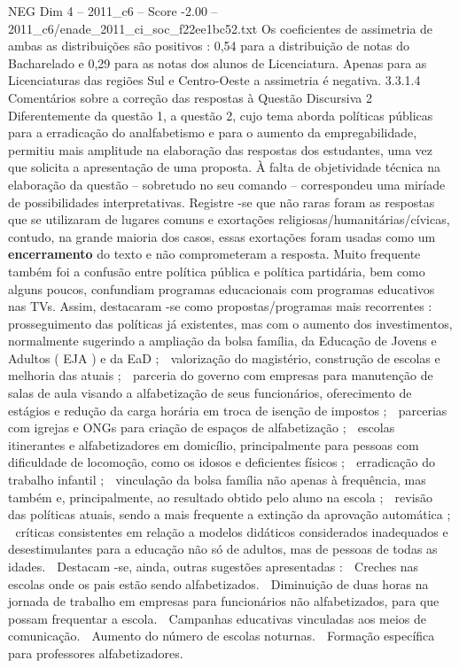 \begin{textsample}{NEG Dim 4 – 2011\_c6 – Score -2.00 – 2011\_c6/enade\_2011\_ci\_soc\_f22ee1bc52.txt}
Os coeficientes de assimetria de ambas as distribuições são positivos : 0,54 para a distribuição de notas do Bacharelado e 0,29 para as notas dos alunos de Licenciatura.
Apenas para as Licenciaturas das regiões Sul e Centro-Oeste a assimetria é negativa. 3.3.1.4 Comentários sobre a correção das respostas à Questão Discursiva 2 Diferentemente da questão 1, a questão 2, cujo tema aborda políticas públicas para a erradicação do analfabetismo e para o aumento da empregabilidade, permitiu mais amplitude na elaboração das respostas dos estudantes, uma vez que solicita a apresentação de uma proposta.
À falta de objetividade técnica na elaboração da questão – sobretudo no seu comando – correspondeu uma miríade de possibilidades interpretativas.
Registre -se que não raras foram as respostas que se utilizaram de lugares comuns e exortações religiosas/humanitárias/cívicas, contudo, na grande maioria dos casos, essas exortações foram usadas como um \textbf{encerramento} do texto e não comprometeram a resposta.
Muito frequente também foi a confusão entre política pública e política partidária, bem como alguns poucos, confundiam programas educacionais com programas educativos nas TVs.
Assim, destacaram -se como propostas/programas mais recorrentes :  prosseguimento das políticas já existentes, mas com o aumento dos investimentos, normalmente sugerindo a ampliação da bolsa família, da Educação de Jovens e Adultos ( EJA ) e da EaD ;  valorização do magistério, construção de escolas e melhoria das atuais ;  parceria do governo com empresas para manutenção de salas de aula visando a alfabetização de seus funcionários, oferecimento de estágios e redução da carga horária em troca de isenção de impostos ;  parcerias com igrejas e ONGs para criação de espaços de alfabetização ;  escolas itinerantes e alfabetizadores em domicílio, principalmente para pessoas com dificuldade de locomoção, como os idosos e deficientes físicos ;  erradicação do trabalho infantil ;  vinculação da bolsa família não apenas à frequência, mas também e, principalmente, ao resultado obtido pelo aluno na escola ;  revisão das políticas atuais, sendo a mais frequente a extinção da aprovação automática ;  críticas consistentes em relação a modelos didáticos considerados inadequados e desestimulantes para a educação não só de adultos, mas de pessoas de todas as idades.  Destacam -se, ainda, outras sugestões apresentadas :  Creches nas escolas onde os pais estão sendo alfabetizados.  Diminuição de duas horas na jornada de trabalho em empresas para funcionários não alfabetizados, para que possam frequentar a escola.  Campanhas educativas vinculadas aos meios de comunicação.  Aumento do número de escolas noturnas.  Formação específica para professores alfabetizadores.

\end{textsample}
